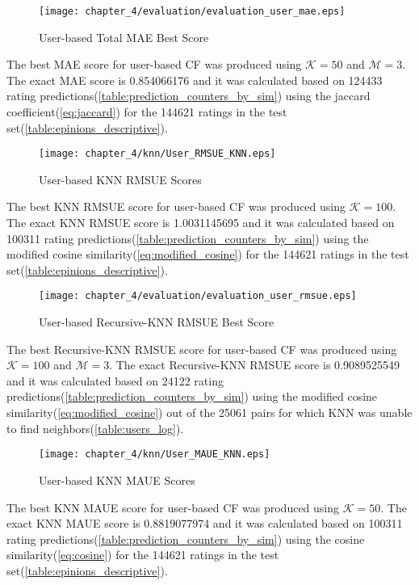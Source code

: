 \begin{figure}[H]
\centering
\texttt{[image: chapter\_4/evaluation/evaluation\_user\_mae.eps]}
\caption{User-based Total MAE Best Score}
\label{figure:user_total_mae}
\end{figure}

The best MAE score for user-based CF was produced using $\mathcal{K}=50$ and $\mathcal{M}=3$.
The exact MAE score is 0.854066176 and it was calculated based on 124433 rating predictions(\autoref{table:prediction_counters_by_sim})
using the jaccard coefficient(\autoref{eq:jaccard})
for the 144621 ratings in the test set(\autoref{table:epinions_descriptive}).

\begin{figure}[H]
\centering
\texttt{[image: chapter\_4/knn/User\_RMSUE\_KNN.eps]}
\caption{User-based KNN RMSUE Scores}
\label{figure:User_knn_rmsue}
\end{figure}

The best KNN RMSUE score for user-based CF was produced using $\mathcal{K}=100$.
The exact KNN RMSUE score is 1.0031145695 and it was calculated based on 100311 rating
predictions(\autoref{table:prediction_counters_by_sim})
using the modified cosine similarity(\autoref{eq:modified_cosine})
for the 144621 ratings in the test set(\autoref{table:epinions_descriptive}).

\begin{figure}[H]
\centering
\texttt{[image: chapter\_4/evaluation/evaluation\_user\_rmsue.eps]}
\caption{User-based Recursive-KNN RMSUE Best Score}
\label{figure:User_rknn_rmsue}
\end{figure}

The best Recursive-KNN RMSUE score for user-based CF was produced using $\mathcal{K}=100$ and $\mathcal{M}=3$.
The exact Recursive-KNN RMSUE score is 0.9089525549 and it was calculated based on 24122 rating
predictions(\autoref{table:prediction_counters_by_sim})
using the modified cosine similarity(\autoref{eq:modified_cosine})
out of the 25061 pairs for which KNN was unable to find neighbors(\autoref{table:users_log}).

\begin{figure}[H]
\centering
\texttt{[image: chapter\_4/knn/User\_MAUE\_KNN.eps]}
\caption{User-based KNN MAUE Scores}
\label{figure:User_knn_maue}
\end{figure}

The best KNN MAUE score for user-based CF was produced using $\mathcal{K}=50$.
The exact KNN MAUE score is 0.8819077974 and it was calculated based on 100311 rating predictions(\autoref{table:prediction_counters_by_sim})
using the cosine similarity(\autoref{eq:cosine})
for the 144621 ratings in the test set(\autoref{table:epinions_descriptive}).

